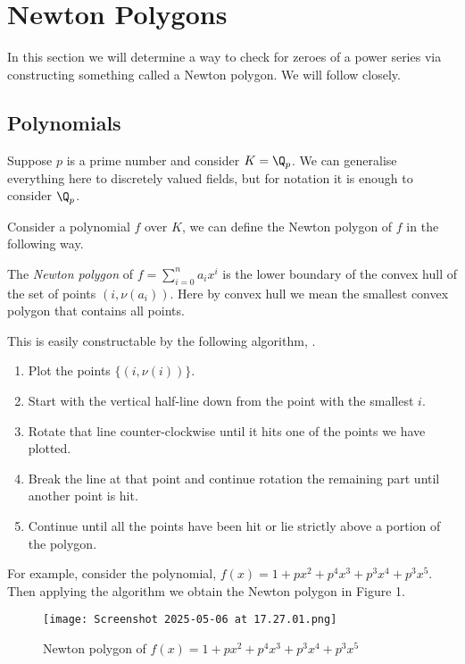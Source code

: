 \section{Newton Polygons}

In this section we will determine a way to check for zeroes of a power series via constructing
something called a Newton polygon. We will follow \cite[Section~7.4]{Gouvea} closely.

\subsection{Polynomials}

Suppose $p$ is a prime number and consider $K = \Q_p$. We can generalise everything here to
discretely valued fields, but for notation it is enough to consider $\Q_p$.

Consider a polynomial $f$ over $K$, we can define the Newton polygon of $f$ in the following way.

\begin{defn}
    The \emph{Newton polygon} of $f = \sum_{i=0}^n a_i x^i$ is the lower boundary of the convex hull
    of the set of points $(i,\nu(a_i))$.
    Here by convex hull we mean the smallest convex polygon that contains all points.
\end{defn}

This is easily constructable by the following algorithm, \cite[Pages~210-211]{Gouvea} .

\begin{enumerate}
    \item Plot the points $\{(i,\nu (i) )\}$.
    \item Start with the vertical half-line down from the point with the smallest $i$.
    \item Rotate that line counter-clockwise until it hits one of the points we have plotted.
    \item Break the line at that point and continue rotation the remaining part until another point
    is hit.
    \item Continue until all the points have been hit or lie strictly above a portion of the
    polygon.
\end{enumerate}

For example, consider the polynomial, $f(x) = 1 + p x^2 + p^4 x^3 + p^3 x^4 + p^3x^5$. Then applying
the algorithm we obtain the Newton polygon in Figure 1.

\begin{figure}[h!]
    \centering
    \texttt{[image: Screenshot 2025-05-06 at 17.27.01.png]}
    \caption{Newton polygon of $f(x)= 1 + px^2+p^4x^3+p^3x^4+p^3x^5$}
\end{figure}


